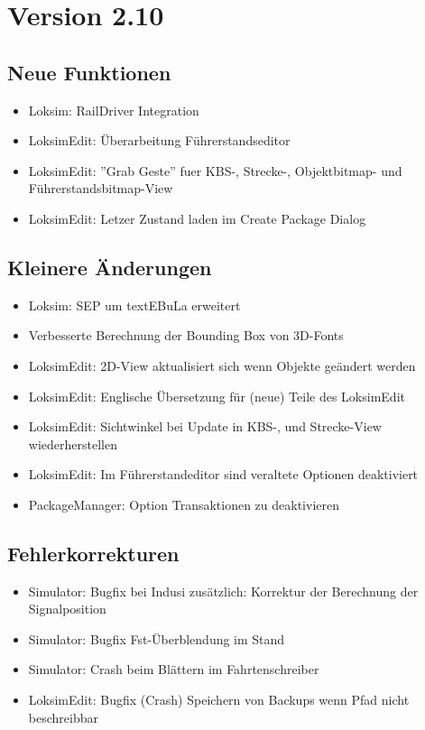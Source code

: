 \section{Version 2.10}
\subsection{Neue Funktionen}
\begin{itemize}
    \item Loksim: RailDriver Integration
    \item LoksimEdit: Überarbeitung Führerstandseditor
    \item LoksimEdit: ''Grab Geste'' fuer KBS-, Strecke-, Objektbitmap- und Führerstandsbitmap-View
    \item LoksimEdit: Letzer Zustand laden im Create Package Dialog
\end{itemize}


\subsection{Kleinere Änderungen}
\begin{itemize}
    \item Loksim: SEP um textEBuLa erweitert
    \item Verbesserte Berechnung der Bounding Box von 3D-Fonts
    \item LoksimEdit: 2D-View aktualisiert sich wenn Objekte geändert werden
    \item LoksimEdit: Englische Übersetzung für (neue) Teile des LoksimEdit
    \item LoksimEdit: Sichtwinkel bei Update in KBS-, und Strecke-View wiederherstellen
    \item LoksimEdit: Im Führerstandeditor sind veraltete Optionen deaktiviert
    \item PackageManager: Option Transaktionen zu deaktivieren
\end{itemize}

\subsection{Fehlerkorrekturen}
\begin{itemize}
    \item Simulator: Bugfix bei Indusi zusätzlich: Korrektur der Berechnung der Signalposition
    \item Simulator: Bugfix Fst-Überblendung im Stand
    \item Simulator: Crash beim Blättern im Fahrtenschreiber
    \item LoksimEdit: Bugfix (Crash) Speichern von Backups wenn Pfad nicht beschreibbar
\end{itemize}
